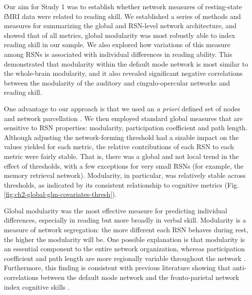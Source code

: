 Our aim for Study 1 was to establish whether network measures of resting-state fMRI data were related to reading skill. We established a series of methods and measures for summarizing the global and RSN-level network architecture, and showed that of all metrics, global modularity was most robustly able to index reading skill in our sample. We also explored how variations of this measure among RSNs is associated with individual differences in reading ability. This demonstrated that modularity within the default mode network is most similar to the whole-brain modularity, and it also revealed significant negative correlations between the modularity of the auditory and cingulo-opercular networks and reading skill.

One advantage to our approach is that we used an \textit{a priori} defined set of nodes and network parcellation \citep{Power2013}. We then employed standard global measures that are sensitive to RSN properties: modularity, participation coefficient and path length. Although adjusting the network-forming threshold had a sizable impact on the values yielded for each metric, the relative contributions of each RSN to each metric were fairly stable. That is, there was a global and not local trend in the effect of thresholds, with a few exceptions for very small RSNs (for example, the memory retrieval network). Modularity, in particular, was relatively stable across thresholds, as indicated by its consistent relationship to cognitive metrics (Fig. \ref{fig:ch2-global-glm-covariates-thresh}).

Global modularity was the most effective measure for predicting individual differences, especially in reading but more broadly in verbal skill. Modularity is a measure of network segregation: the more different each RSN behaves during rest, the higher the modularity will be. One possible explanation is that modularity is an essential component to the entire network organization, whereas participation coefficient and path length are more regionally variable throughout the network \citep{Bullmore2012}. Furthermore, this finding is consistent with previous literature showing that anti-correlations between the default mode network and the fronto-parietal network index cognitive skills \citep{Anticevic2012}. 

